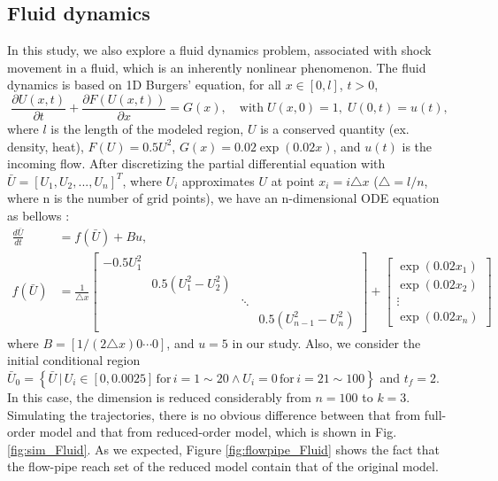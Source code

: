 \documentclass[runningheads,a4paper]{llncs}
\theoremstyle{definition}
\theoremstyle{plain}
\begin{document}
\subsection{Fluid dynamics}
In this study, we also explore a fluid dynamics problem, associated with shock movement in a fluid, which is an inherently nonlinear phenomenon. The fluid dynamics is based on 1D Burgers’ equation, for all $x\in \left[0,l\right]$, $t>0$,
\begin{equation}
\frac{\partial U(x,t)}{\partial t}+\frac{\partial F(U(x,t))}{\partial x}=G(x), \quad \mbox{with}\;U(x,0)=1,\;U(0,t)=u(t),
\end{equation}
where $l$ is the length of the modeled region, $U$ is a conserved quantity (ex. density, heat), $F(U)=0.5U^2$, $G(x)=0.02\exp(0.02x)$, and $u(t)$ is the incoming flow.  After discretizing the partial differential equation with $\bar{U}=\left[U_1, U_2, ...,U_n\right]^T$, where $U_i$ approximates $U$ at point $x_i=i\triangle x$ ($\triangle=l/n$, where n is the number of grid points), we have an n-dimensional ODE equation as bellows \cite{REWIENSKI2006426}:
\begin{align}
\frac{d\bar{U}}{dt}&=f(\bar{U})+Bu,\\
f(\bar{U})&=\frac{1}{\triangle x}
\begin{bmatrix}
    -0.5U_1^2 &  &   &     \\
       & 0.5(U_1^2-U_2^2) &  &     \\
        &  & \ddots &    \\
        &    &  & 0.5(U_{n-1}^2-U_{n}^2)
\end{bmatrix} +
\begin{bmatrix}
    \exp(0.02x_1)     \\
     \exp(0.02x_2)    \\
    \vdots    \\
      \exp(0.02x_n)
\end{bmatrix}
\end{align}
where $B=\left[1/(2\triangle x)0 \cdots0\right]$, and $u=5$ in our study. Also, we consider the initial conditional region $\bar{U}_0=\left\{\bar{U} \, |\, U_i \in [0,0.0025]  \, \mbox{for}\, i=1\sim20 \wedge U_i=0 \,  \mbox{for}\, i=21\sim100 \right\}$ and $t_f=2$.  In this case, the dimension is reduced considerably from $n=100$ to $k=3$.  Simulating the trajectories, there is no obvious difference between that from full-order model and that from reduced-order model, which is shown in Fig. \ref{fig:sim_Fluid}. As we expected, Figure \ref{fig:flowpipe_Fluid} shows the fact that the flow-pipe reach set of the reduced model contain that of the original model.
\end{document}
